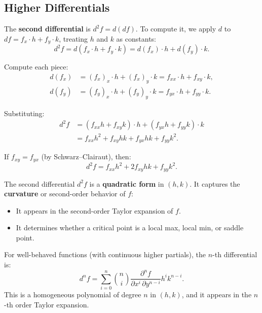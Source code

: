 \documentclass[11pt]{report}
\begin{document}
\subsection{Higher Differentials}

\begin{definition}
The \textbf{second differential} is $d^2f = d(df)$. To compute it, we apply $d$ to $df = f_x \cdot h + f_y \cdot k$, treating $h$ and $k$ as constants:
\[
d^2f = d(f_x \cdot h + f_y \cdot k) = d(f_x) \cdot h + d(f_y) \cdot k.
\]

Compute each piece:
\begin{align*}
d(f_x) &= (f_x)_x \cdot h + (f_x)_y \cdot k = f_{xx} \cdot h + f_{xy} \cdot k, \\
d(f_y) &= (f_y)_x \cdot h + (f_y)_y \cdot k = f_{yx} \cdot h + f_{yy} \cdot k.
\end{align*}

Substituting:
\begin{align*}
d^2f &= (f_{xx} h + f_{xy} k) \cdot h + (f_{yx} h + f_{yy} k) \cdot k \\
&= f_{xx} h^2 + f_{xy} hk + f_{yx} hk + f_{yy} k^2.
\end{align*}

If $f_{xy} = f_{yx}$ (by Schwarz--Clairaut), then:
\[
d^2f = f_{xx} h^2 + 2f_{xy} hk + f_{yy} k^2.
\]
\end{definition}

\begin{remark}[Interpretation of $d^2f$]
The second differential $d^2f$ is a \textbf{quadratic form} in $(h, k)$. It captures the \textbf{curvature} or second-order behavior of $f$:
\begin{itemize}[itemsep=2pt]
    \item It appears in the second-order Taylor expansion of $f$.
    \item It determines whether a critical point is a local max, local min, or saddle point.
\end{itemize}
\end{remark}

\begin{definition}
For well-behaved functions (with continuous higher partials), the $n$-th differential is:
\[
d^n f = \sum_{i=0}^{n} \binom{n}{i} \frac{\partial^n f}{\partial x^i \, \partial y^{n-i}} h^i k^{n-i}.
\]
This is a homogeneous polynomial of degree $n$ in $(h, k)$, and it appears in the $n$-th order Taylor expansion.
\end{definition}
\end{document}
